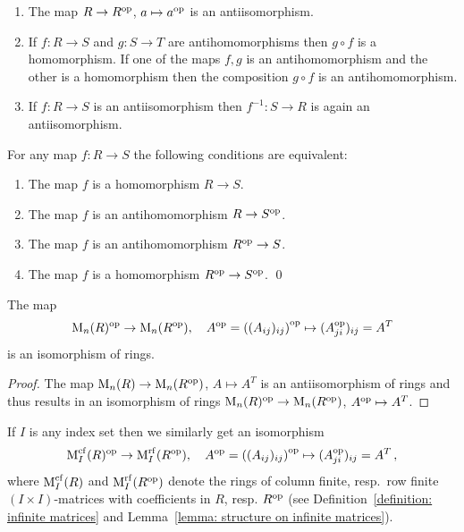 \begin{example}
  \leavevmode
  \begin{enumerate}
     \item
      The map $R \to R^{\operatorname{op}}$, $a \mapsto a^{\operatorname{op}}$ is an antiisomorphism.
     \item
      If $f \colon R \to S$ and $g \colon S \to T$ are antihomomorphisms then $g \circ f$ is a homomorphism.
      If one of the maps $f, g$ is an antihomomorphism and the other is a homomorphism then the composition $g \circ f$ is an antihomomorphism.
    \item
      If $f \colon R \to S$ is an antiisomorphism then $f^{-1} \colon S \to R$ is again an antiisomorphism.
  \end{enumerate}
\end{example}


\begin{lemma}
  For any map $f \colon R \to S$ the following conditions are equivalent:
  \begin{enumerate}
    \item
      The map $f$ is a homomorphism $R \to S$.
    \item
      The map $f$ is an antihomomorphism $R \to S^{\operatorname{op}}$.
    \item
      The map $f$ is an antihomomorphism $R^{\operatorname{op}} \to S$.
    \item
      The map $f$ is a homomorphism $R^{\operatorname{op}} \to S^{\operatorname{op}}$.
    \qed
  \end{enumerate}
\end{lemma}


\begin{lemma}
  \label{lemma: op of matrix rings}
  The map
  \[
            \operatorname{M}_n(R)^{\operatorname{op}}
    \to     \operatorname{M}_n(R^{\operatorname{op}}),
    \quad   A^{\operatorname{op}}
    =       \left( (A_{ij})_{ij} \right)^{{\operatorname{op}}}
    \mapsto (A_{ji}^{\operatorname{op}})_{ij}
    =       A^T
  \]
  is an isomorphism of rings.
\end{lemma}


\begin{proof}
  The map $\operatorname{M}_n(R) \to \operatorname{M}_n(R^{\operatorname{op}})$, $A \mapsto A^T$ is an antiisomorphism of rings and thus results in an isomorphism of rings $\operatorname{M}_n(R)^{\operatorname{op}} \to \operatorname{M}_n(R^{\operatorname{op}})$, $A^{\operatorname{op}} \mapsto A^T$.
\end{proof}


\begin{remark}
  \label{remark: transposing infinite matrix ring opposite ring}
  If $I$ is any index set then we similarly get an isomorphism
  \[
            \operatorname{M}_I^{\operatorname{cf}}(R)^{\operatorname{op}}
    \to
            \operatorname{M}_I^{{\operatorname{rf}}}(R^{\operatorname{op}}),
    \quad   A^{\operatorname{op}}
    =       \left( (A_{ij})_{ij} \right)^{{\operatorname{op}}}
    \mapsto (A_{ji}^{\operatorname{op}})_{ij}
    =       A^T \,,
  \]
  where $\operatorname{M}_I^{\operatorname{cf}}(R)$ and $\operatorname{M}_I^{\operatorname{rf}}(R^{\operatorname{op}})$ denote the rings of column finite, resp.\ row finite $(I \times I)$-matrices with coefficients in $R$, resp. $R^{\operatorname{op}}$ (see Definition~\ref{definition: infinite matrices} and Lemma~\ref{lemma: structure on infinite matrices}).
\end{remark}


